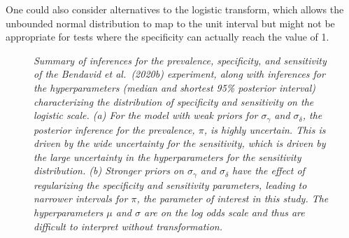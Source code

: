 \documentclass[11pt]{article}
\begin{document}
One could also consider alternatives to the logistic transform, which
allows the unbounded normal distribution to map to the unit interval
but might not be appropriate for tests where the specificity can
actually reach the value of 1.
%
\begin{figure}
\caption{\em Summary of inferences for the prevalence, specificity,
  and sensitivity of the Bendavid et al.\ (2020b) experiment, along
  with inferences for the hyperparameters (median and shortest 95\%
  posterior interval) characterizing the distribution of specificity
  and sensitivity on the logistic scale.  (a) For the model with weak
  priors for $\sigma_{\gamma}$ and $\sigma_{\delta}$, the posterior
  inference for the prevalence, $\pi$, is highly uncertain.  This is
  driven by the wide uncertainty for the sensitivity, which is driven
  by the large uncertainty in the hyperparameters for the sensitivity
  distribution. (b) Stronger priors on $\sigma_{\gamma}$ and
  $\sigma_{\delta}$ have the effect of regularizing the specificity
  and sensitivity parameters, leading to narrower intervals for $\pi$,
  the parameter of interest in this study.  The hyperparameters $\mu$
  and $\sigma$ are on the log odds scale and thus are difficult to
  interpret without transformation.}
\label{posterior2}
\end{figure}
\end{document}

